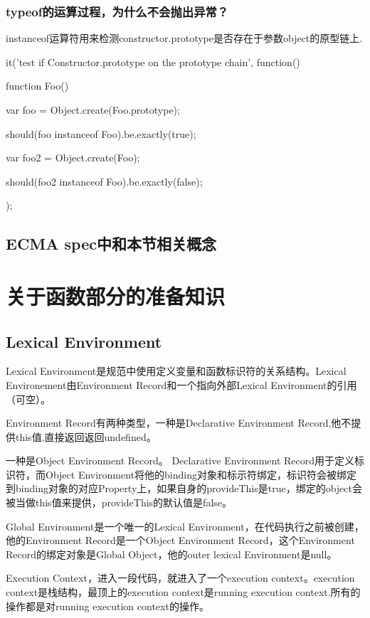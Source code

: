 \subsubsection{typeof的运算过程，为什么不会抛出异常？}

instanceof运算符用来检测constructor.prototype是否存在于参数object的原型链上.
\begin{JavaScript}
		it('test if Constructor.prototype on the prototype chain', function(){
			function Foo(){}

			var foo = Object.create(Foo.prototype);

			should(foo instanceof Foo).be.exactly(true);

			var foo2 = Object.create(Foo);

			should(foo2 instanceof Foo).be.exactly(false);
		});
\end{JavaScript}
	
\subsection{ECMA spec中和本节相关概念}
\section{关于函数部分的准备知识}
\subsection{Lexical Environment}

Lexical Environment是规范中使用定义变量和函数标识符的关系结构。Lexical Environement由Environment Record和一个指向外部Lexical Environment的引用（可空）。

Environment Record有两种类型，一种是Declarative Environment Record,他不提供this值,直接返回返回undefined。

一种是Object Environment Record。 Declarative Environment Record用于定义标识符，而Object Environment将他的binding对象和标示符绑定，标识符会被绑定到binding对象的对应Property上，如果自身的provideThis是true，绑定的object会被当做this值来提供，provideThis的默认值是false。

Global Environment是一个唯一的Lexical Environment，在代码执行之前被创建，他的Environment Record是一个Object Environment Record，这个Environment Record的绑定对象是Global Object，他的outer lexical Environment是null。


Execution Context，进入一段代码，就进入了一个execution context。execution context是栈结构，最顶上的execution context是running execution context.所有的操作都是对running execution context的操作。

